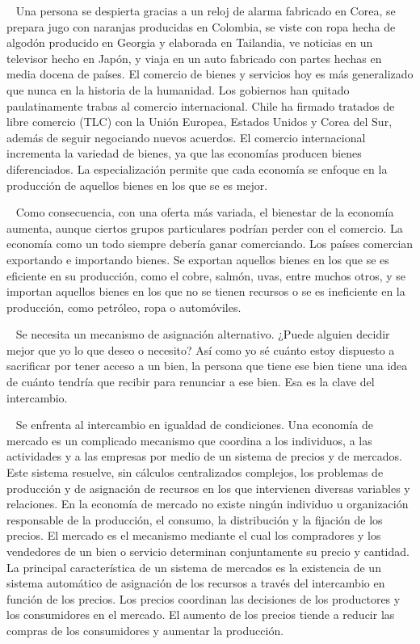 \documentclass[
  letterpaper,
  DIV=11,
  numbers=noendperiod]{scrreport}
\begin{document}
~ Una persona se despierta gracias a un reloj de alarma fabricado en
Corea, se prepara jugo con naranjas producidas en Colombia, se viste con
ropa hecha de algodón producido en Georgia y elaborada en Tailandia, ve
noticias en un televisor hecho en Japón, y viaja en un auto fabricado
con partes hechas en media docena de países. El comercio de bienes y
servicios hoy es más generalizado que nunca en la historia de la
humanidad. Los gobiernos han quitado paulatinamente trabas al comercio
internacional. Chile ha firmado tratados de libre comercio (TLC) con la
Unión Europea, Estados Unidos y Corea del Sur, además de seguir
negociando nuevos acuerdos. El comercio internacional incrementa la
variedad de bienes, ya que las economías producen bienes diferenciados.
La especialización permite que cada economía se enfoque en la producción
de aquellos bienes en los que se es mejor.

~ Como consecuencia, con una oferta más variada, el bienestar de la
economía aumenta, aunque ciertos grupos particulares podrían perder con
el comercio. La economía como un todo siempre debería ganar comerciando.
Los países comercian exportando e importando bienes. Se exportan
aquellos bienes en los que se es eficiente en su producción, como el
cobre, salmón, uvas, entre muchos otros, y se importan aquellos bienes
en los que no se tienen recursos o se es ineficiente en la producción,
como petróleo, ropa o automóviles.

~ Se necesita un mecanismo de asignación alternativo. ¿Puede alguien
decidir mejor que yo lo que deseo o necesito? Así como yo sé cuánto
estoy dispuesto a sacrificar por tener acceso a un bien, la persona que
tiene ese bien tiene una idea de cuánto tendría que recibir para
renunciar a ese bien. Esa es la clave del intercambio.

~ Se enfrenta al intercambio en igualdad de condiciones. Una economía de
mercado es un complicado mecanismo que coordina a los individuos, a las
actividades y a las empresas por medio de un sistema de precios y de
mercados. Este sistema resuelve, sin cálculos centralizados complejos,
los problemas de producción y de asignación de recursos en los que
intervienen diversas variables y relaciones. En la economía de mercado
no existe ningún individuo u organización responsable de la producción,
el consumo, la distribución y la fijación de los precios. El mercado es
el mecanismo mediante el cual los compradores y los vendedores de un
bien o servicio determinan conjuntamente su precio y cantidad. La
principal característica de un sistema de mercados es la existencia de
un sistema automático de asignación de los recursos a través del
intercambio en función de los precios. Los precios coordinan las
decisiones de los productores y los consumidores en el mercado. El
aumento de los precios tiende a reducir las compras de los consumidores
y aumentar la producción.
\end{document}
